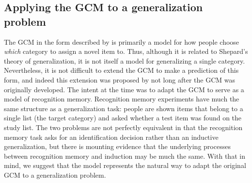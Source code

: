 \documentclass[doc,apacite]{apa6}
\begin{document}


\subsection{Applying the GCM to a generalization problem} 

The GCM in the form described by  is primarily a model for how people choose {\it which} category to assign a novel item to. Thus, although it is related to Shepard's theory of generalization, it is not itself a model for generalizing a single category. 
Nevertheless, it is not difficult to extend the GCM to make a prediction of this form, and indeed this extension was proposed by  not long after the GCM was originally developed. The intent at the time was to adapt the GCM to serve as a model of recognition memory. Recognition memory experiments have much the same structure as a generalization task: people are shown items that belong to a single list (the target category) and asked whether a test item was found on the study list. The two problems are not perfectly equivalent in that the recognition memory task asks for an identification decision rather than an inductive generalization, but there is mounting evidence \cite{nosofsky1991tests, hawkins2016dynamic, nosofsky2016exemplar, nosofsky2014exemplar} that the underlying processes between recognition memory and induction may be much the same. With that in mind, we suggest that the  model represents the natural way to adapt the original GCM to a generalization problem.
\end{document}
